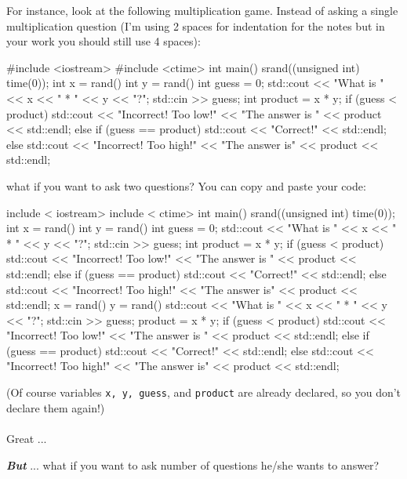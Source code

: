 For instance, look at the following multiplication game. Instead of asking
a single multiplication question (I'm using 2 spaces for indentation for the
notes but in your work you should still use 4 spaces):
\begin{console}
#include <iostream>
#include <ctime>
int main()
  {
    srand((unsigned int) time(0));
    int x = rand() %
    int y = rand() %
    int guess = 0;
    std::cout << "What is " << x << " * " << y << "?";
    std::cin >> guess;
    int product = x * y;
    if (guess < product)
    {
      std::cout << "Incorrect! Too low!"
      << "The answer is " << product
      << std::endl;
    }
    else if (guess == product)
    {
      std::cout << "Correct!" << std::endl;
    }
    else
    {
      std::cout << "Incorrect! Too high!"
      << "The answer is" << product
      << std::endl;
    }
}
\end{console}
what if you want to ask two questions? You can copy and paste your code:
\begin{console}
include < iostream>
include < ctime>
int main()
{
    srand((unsigned int) time(0));
    int x = rand() %
    int y = rand() %
    int guess = 0;
    std::cout << "What is " << x << " * " << y << "?";
    std::cin >> guess;
    int product = x * y;
    if (guess < product)
    {
      std::cout << "Incorrect! Too low!"
      << "The answer is " << product
      << std::endl;
    }
    else if (guess == product)
    {
      std::cout << "Correct!" << std::endl;
    }
    else
    {
      std::cout << "Incorrect! Too high!"
      << "The answer is" << product
      << std::endl;
    }
    x = rand() %
    y = rand() %
    std::cout << "What is " << x << " * " << y << "?";
    std::cin >> guess;
    product = x * y;
    if (guess < product)
    {
      std::cout << "Incorrect! Too low!"
      << "The answer is " << product
      << std::endl;
    }
    else if (guess == product)
    {
      std::cout << "Correct!" << std::endl;
    }
    else
    {
      std::cout << "Incorrect! Too high!"
      << "The answer is" << product
      << std::endl;
    }
}
\end{console}
(Of course variables \verb!x, y, guess!, and \verb!product! are already declared, so
you don’t declare them again!)\\\\

Great ...

\textit{\textbf{But}} ... what if you want to ask 
number of questions he/she wants to answer?

